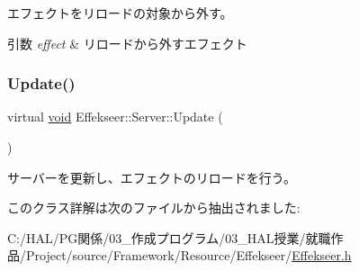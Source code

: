 エフェクトをリロードの対象から外す。 


\begin{DoxyParams}{引数}
{\em effect} & リロードから外すエフェクト \\
\hline
\end{DoxyParams}
\mbox{\label{class_effekseer_1_1_server_af841f04fb41ed36b888cb2f89c4c0771}} 
\subsubsection{\texorpdfstring{Update()}{Update()}}
{\footnotesize\ttfamily virtual \mbox{\hyperlink{namespace_effekseer_ab34c4088e512200cf4c2716f168deb56}{void}} Effekseer\+::\+Server\+::\+Update (\begin{DoxyParamCaption}{ }\end{DoxyParamCaption})\hspace{0.3cm}{\ttfamily [pure virtual]}}



サーバーを更新し、エフェクトのリロードを行う。 



このクラス詳解は次のファイルから抽出されました\+:\begin{DoxyCompactItemize}
\item 
C\+:/\+H\+A\+L/\+P\+G関係/03\+\_\+作成プログラム/03\+\_\+\+H\+A\+L授業/就職作品/\+Project/source/\+Framework/\+Resource/\+Effekseer/\mbox{\hyperlink{_effekseer_8h}{Effekseer.\+h}}\end{DoxyCompactItemize}
